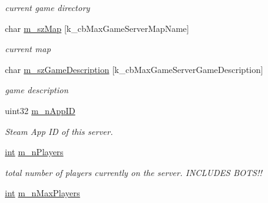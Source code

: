 \begin{DoxyCompactItemize}
\begin{DoxyCompactList}\small\item\em current game directory \end{DoxyCompactList}\item 
\hypertarget{classgameserveritem__t_af2308ac9d729d06bf0dde10e729ab417}{}char \hyperlink{classgameserveritem__t_af2308ac9d729d06bf0dde10e729ab417}{m\+\_\+sz\+Map} \mbox{[}k\+\_\+cb\+Max\+Game\+Server\+Map\+Name\mbox{]}\label{classgameserveritem__t_af2308ac9d729d06bf0dde10e729ab417}

\begin{DoxyCompactList}\small\item\em current map \end{DoxyCompactList}\item 
\hypertarget{classgameserveritem__t_a0c7ee14b176d1cd0208187267febb85d}{}char \hyperlink{classgameserveritem__t_a0c7ee14b176d1cd0208187267febb85d}{m\+\_\+sz\+Game\+Description} \mbox{[}k\+\_\+cb\+Max\+Game\+Server\+Game\+Description\mbox{]}\label{classgameserveritem__t_a0c7ee14b176d1cd0208187267febb85d}

\begin{DoxyCompactList}\small\item\em game description \end{DoxyCompactList}\item 
\hypertarget{classgameserveritem__t_a1570f474cde97c276735cff6dd9d3f79}{}uint32 \hyperlink{classgameserveritem__t_a1570f474cde97c276735cff6dd9d3f79}{m\+\_\+n\+App\+I\+D}\label{classgameserveritem__t_a1570f474cde97c276735cff6dd9d3f79}

\begin{DoxyCompactList}\small\item\em Steam App I\+D of this server. \end{DoxyCompactList}\item 
\hypertarget{classgameserveritem__t_adb038abec9ad94d1631326e4d7bc7f09}{}\hyperlink{SDL__thread_8h_a6a64f9be4433e4de6e2f2f548cf3c08e}{int} \hyperlink{classgameserveritem__t_adb038abec9ad94d1631326e4d7bc7f09}{m\+\_\+n\+Players}\label{classgameserveritem__t_adb038abec9ad94d1631326e4d7bc7f09}

\begin{DoxyCompactList}\small\item\em total number of players currently on the server. I\+N\+C\+L\+U\+D\+E\+S B\+O\+T\+S!! \end{DoxyCompactList}\item 
\hypertarget{classgameserveritem__t_adb7b54e32669f205bacb7c766fa90ff3}{}\hyperlink{SDL__thread_8h_a6a64f9be4433e4de6e2f2f548cf3c08e}{int} \hyperlink{classgameserveritem__t_adb7b54e32669f205bacb7c766fa90ff3}{m\+\_\+n\+Max\+Players}\label{classgameserveritem__t_adb7b54e32669f205bacb7c766fa90ff3}


\end{DoxyCompactItemize}
